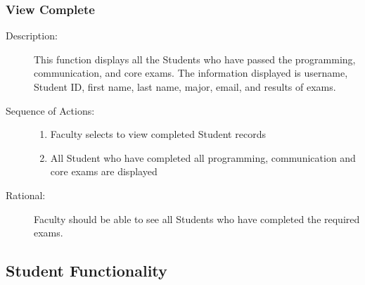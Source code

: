    \subsubsection{\large View Complete}  
   \begin{boxed} %
      \begin{description}
         \item[Description:\label{desc:view_complete}]
      This function displays all the Students who have passed the
         programming, communication, and core exams. The information displayed
         is username, Student ID, first name, last name, major, email, and
         results of exams.
         
            \item[Sequence of Actions:]\hspace{10cm}
         \begin{enumerate}
            \item Faculty selects to view completed Student records
            \item All Student who have completed all programming, communication
               and core exams are displayed
      \end{enumerate}

            \item[Rational:]
         Faculty should be able to see all Students who have completed the
         required exams.
      \end{description}
   \end{boxed} %


\subsection{Student Functionality}

